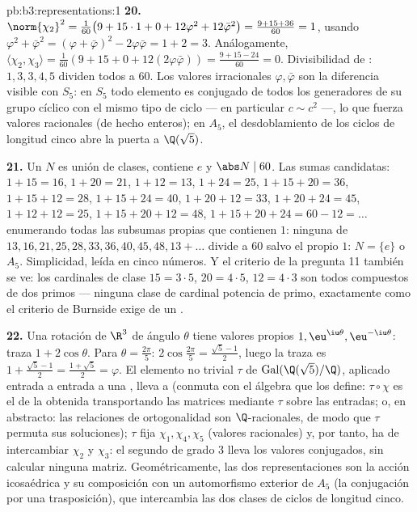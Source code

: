 \begin{solution}{pb:b3:representations:1}
\textbf{20.} $\norm{\chi_2}^2 = \frac1{60}\bigl(9 + 15\cdot1 +
0 + 12\varphi^2 + 12\bar\varphi^2\bigr) = \frac{9 + 15 +
36}{60} = 1$, usando $\varphi^2 + \bar\varphi^2 = (\varphi +
\bar\varphi)^2 - 2\varphi\bar\varphi = 1 + 2 = 3$. Análogamente,
$\langle\chi_2, \chi_3\rangle = \frac1{60}(9 + 15 + 0 +
12(2\varphi\bar\varphi)) = \frac{9 + 15 - 24}{60} = 0$.
Divisibilidad de :
$1, 3, 3, 4, 5$ dividen todos a $60$. Los valores irracionales
$\varphi, \bar\varphi$ son la diferencia visible con $S_5$: en $S_5$
todo elemento es conjugado de todos los generadores de su grupo cíclico
con el mismo tipo de ciclo --- en particular $c \sim c^2$ ---, lo que
fuerza valores 
racionales (de hecho enteros); en $A_5$, el desdoblamiento de los ciclos
de longitud cinco abre la puerta a $\Q(\sqrt5)$.

\textbf{21.} Un  $N$ es
unión de clases, contiene $e$ y $\abs N \mid 60$. Las sumas candidatas:
$1{+}15 = 16$, $1{+}20 = 21$, $1{+}12 = 13$, $1{+}24 = 25$,
$1{+}15{+}20 = 36$, $1{+}15{+}12 = 28$, $1{+}15{+}24 = 40$,
$1{+}20{+}12 = 33$, $1{+}20{+}24 = 45$, $1{+}12{+}12 = 25$,
$1{+}15{+}20{+}12 = 48$, $1{+}15{+}20{+}24 = 60 - 12 = \dots$
enumerando todas las subsumas propias que contienen $1$: ninguna de
$13, 16,
21, 25, 28, 33, 36, 40, 45, 48, 13{+}\dots$ divide a $60$ salvo el
propio $1$: $N = \{e\}$ o $A_5$. Simplicidad, leída en cinco números. Y
el criterio de la pregunta 11 también se ve: los cardinales de clase
$15 = 3\cdot5$, $20 = 4\cdot5$, $12 = 4\cdot3$ son todos compuestos de
dos primos --- ninguna clase de cardinal potencia de primo, exactamente
como el criterio de Burnside exige de un
.

\textbf{22.} Una rotación de $\R^3$ de ángulo $\theta$ tiene valores
propios $1, \eu^{\iu\theta}, \eu^{-\iu\theta}$: traza $1 +
2\cos\theta$. Para $\theta = \frac{2\pi}5$: $2\cos\frac{2\pi}5
= \frac{\sqrt5 - 1}2$, luego la traza es $1 + \frac{\sqrt5-1}2 =
\frac{1+\sqrt5}2 = \varphi$. El elemento no trivial $\tau$ de
$\operatorname{Gal}(\Q(\sqrt5)/\Q)$, aplicado entrada a entrada a una
, lleva
 a
 (conmuta con el
álgebra que los define: $\tau\circ\chi$ es el
 de la
 obtenida
transportando las matrices mediante $\tau$ sobre las entradas; o, en
abstracto: las relaciones de ortogonalidad son $\Q$-racionales, de modo
que $\tau$ permuta sus soluciones); $\tau$ fija $\chi_1, \chi_4, \chi_5$
(valores racionales) y, por tanto, ha de intercambiar $\chi_2$ y
$\chi_3$: el segundo 
de grado $3$ lleva los valores conjugados, sin calcular ninguna matriz.
Geométricamente, las dos
representaciones son la acción
icosaédrica y su composición con un automorfismo exterior de $A_5$ (la
conjugación por una trasposición), que intercambia las dos clases de
ciclos de longitud cinco.


\end{solution}
